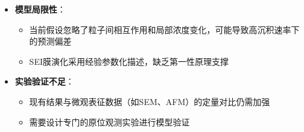 \documentclass{article}
\begin{document}
\begin{itemize}
\item \textbf{模型局限性}：
\begin{itemize}
    \item 当前假设忽略了粒子间相互作用和局部浓度变化，可能导致高沉积速率下的预测偏差
    \item SEI膜演化采用经验参数化描述，缺乏第一性原理支撑
\end{itemize}



\item \textbf{实验验证不足}：
\begin{itemize}
    \item 现有结果与微观表征数据（如SEM、AFM）的定量对比仍需加强
    \item 需要设计专门的原位观测实验进行模型验证
\end{itemize}

\end{itemize}




 
\end{document}
